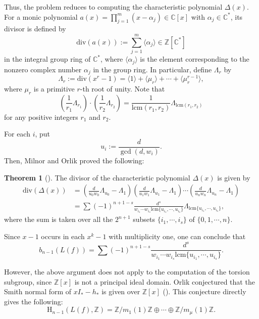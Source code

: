 \documentclass[12pt]{amsart}
\theoremstyle{definition}
\newtheorem{theorem}[equation]{Theorem}
\theoremstyle{remark}
\begin{document}
Thus, the problem reduces to computing the characteristic polynomial $\Delta(x)$. 
For a monic polynomial $a(x)=\prod_{j=1}^m(x-\alpha_j)\in\mathbb{C}[x]$ with $\alpha_j\in\mathbb{C}^\ast$, its divisor is defined by
\[
    \mathrm{div}(a(x)):=\sum_{j=1}^m\langle\alpha_j\rangle\in\mathbb{Z}[\mathbb{C}^\ast]
\]
in the integral group ring of $\mathbb{C}^*$, where $\langle\alpha_j\rangle$ is the element corresponding to the nonzero complex number $\alpha_j$ in the group ring.
In particular, define $\Lambda_r$ by
\[
    \Lambda_r:=\mathrm{div}(x^r-1)=\langle1\rangle+\langle\mu_r\rangle+\cdots+\langle\mu_r^{r-1}\rangle,
\]
where $\mu_r$ is a primitive $r$-th root of unity.
Note that $$\left(\frac{1}{r_1}\Lambda_{r_1}\right)\cdot\left(\frac{1}{r_2}\Lambda_{r_2}\right)=\frac{1}{\mathrm{lcm}(r_1,r_2)}\Lambda_{\mathrm{lcm}(r_1,r_2)}$$  for any positive integers $r_1$ and $r_2$.
 

For each $i$, put $$u_i:=\frac{d}{\gcd(d, w_i)}.$$ Then, Milnor and Orlik proved the following:
\begin{theorem}[{\cite[Corollary]{MO70}}]\label{theorem:MO}
    The divisor of the characteristic polynomial $\Delta(x)$ is given by
    \begin{align*}
        \mathrm{div}(\Delta(x))
        &=\left(\frac{d}{u_0w_0}\Lambda_{u_0}-\Lambda_1\right)\left(\frac{d}{u_1w_1}\Lambda_{u_1}-\Lambda_1\right)\cdots\left(\frac{d}{u_nw_n}\Lambda_{u_n}-\Lambda_1\right)\\
        &=\sum(-1)^{n+1-s}\frac{d^s}{w_{i_1}\cdots w_{i_s}\mathrm{lcm} \{u_{i_1},\cdots, u_{i_s}\}}\Lambda_{\mathrm{lcm}\{u_{i_1},\cdots,u_{i_s}\}},
    \end{align*}
    where the sum is taken over all the $2^{n+1}$ subsets $\{i_1,\cdots, i_s\}$ of $\{0,1,\cdots,n\}$.

\end{theorem}

Since $x-1$ occurs in each $x^k-1$ with multiplicity one, one can conclude that
\begin{equation}\label{eq:betti}
    b_{n-1}(L(f))=\sum(-1)^{{n+1}-s}\frac{d^s}{w_{i_1}\cdots w_{i_s}\mathrm{lcm} \{u_{i_1},\cdots, u_{i_s}\}}.
\end{equation}

However, the above argument does not apply to the computation of the torsion subgroup, since $\mathbb{Z}[x]$ is not a principal ideal domain. Orlik conjectured that the Smith normal form of $xI_\ast-h_\ast$ is  given over
$\mathbb{Z}[x]$ (\cite[Conjecture~3.1]{O71}).
This conjecture directly gives the following:
\[
    \mathrm{H}_{n-1}(L(f),\mathbb{Z})=\mathbb{Z}/m_1(1)\mathbb{Z}\oplus\cdots\oplus\mathbb{Z}/m_\mu(1)\mathbb{Z}.
\]
\end{document}
